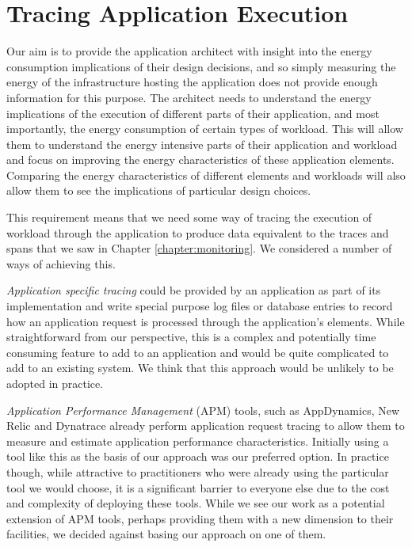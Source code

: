 \section{Tracing Application Execution}

Our aim is to provide the application architect with insight into the energy consumption implications of their design decisions, and so simply measuring the energy of the infrastructure hosting the application does not provide enough information for this purpose.  The architect needs to understand the energy implications of the execution of different parts of their application, and most importantly, the energy consumption of certain types of workload.  This will allow them to understand the energy intensive parts of their application and workload and focus on improving the energy characteristics of these application elements.  Comparing the energy characteristics of different elements and workloads will also allow them to see the implications of particular design choices.

This requirement means that we need some way of tracing the execution of workload through the application to produce data equivalent to the traces and spans that we saw in Chapter \ref{chapter:monitoring}.  We considered a number of ways of achieving this.

\emph{Application specific tracing} could be provided by an application as part of its implementation and write special purpose log files or database entries to record how an application request is processed through the application's elements.  While straightforward from our perspective, this is a complex and potentially time consuming feature to add to an application and would be quite complicated to add to an existing system.  We think that this approach would be unlikely to be adopted in practice.

\emph{Application Performance Management} (APM) tools, such as AppDynamics, New Relic and Dynatrace \cite{appdynamics2018, newrelic2018, dynatrace2018} already perform application request tracing to allow them to measure and estimate application performance characteristics.  Initially using a tool like this as the basis of our approach was our preferred option.  In practice though, while attractive to practitioners who were already using the particular tool we would choose, it is a significant barrier to everyone else due to the cost and complexity of deploying these tools.  While we see our work as a potential extension of APM tools, perhaps providing them with a new dimension to their facilities, we decided against basing our approach on one of them.

